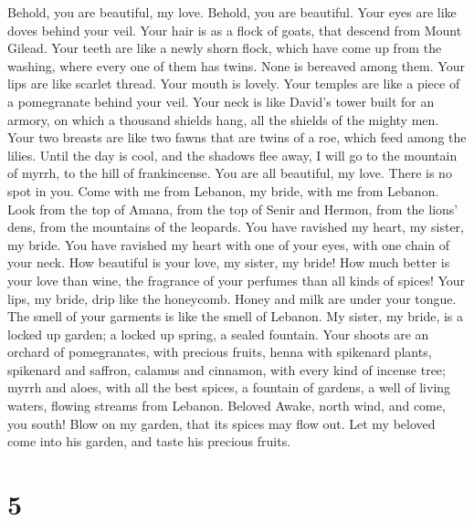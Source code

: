  Behold, you are beautiful, my love. Behold, you are
beautiful. Your eyes are like doves behind your veil. Your hair is as a
flock of goats, that descend from Mount Gilead.  Your teeth
are like a newly shorn flock, which have come up from the washing, where
every one of them has twins. None is bereaved among them. 
Your lips are like scarlet thread. Your mouth is lovely. Your temples
are like a piece of a pomegranate behind your veil.  Your
neck is like David's tower built for an armory, on which a thousand
shields hang, all the shields of the mighty men.  Your two
breasts are like two fawns that are twins of a roe, which feed among the
lilies.  Until the day is cool, and the shadows flee away, I
will go to the mountain of myrrh, to the hill of frankincense.
 You are all beautiful, my love. There is no spot in you.
 Come with me from Lebanon, my bride, with me from Lebanon.
Look from the top of Amana, from the top of Senir and Hermon, from the
lions' dens, from the mountains of the leopards.  You have
ravished my heart, my sister, my bride. You have ravished my heart with
one of your eyes, with one chain of your neck.  How
beautiful is your love, my sister, my bride! How much better is your
love than wine, the fragrance of your perfumes than all kinds of spices!
 Your lips, my bride, drip like the honeycomb. Honey and
milk are under your tongue. The smell of your garments is like the smell
of Lebanon.  My sister, my bride, is a locked up garden; a
locked up spring, a sealed fountain.  Your shoots are an
orchard of pomegranates, with precious fruits, henna with spikenard
plants,  spikenard and saffron, calamus and cinnamon, with
every kind of incense tree; myrrh and aloes, with all the best spices,
 a fountain of gardens, a well of living waters, flowing
streams from Lebanon. Beloved  Awake, north wind, and come,
you south! Blow on my garden, that its spices may flow out. Let my
beloved come into his garden, and taste his precious fruits.

\hypertarget{section-4}{%
\section{5}\label{section-4}}


